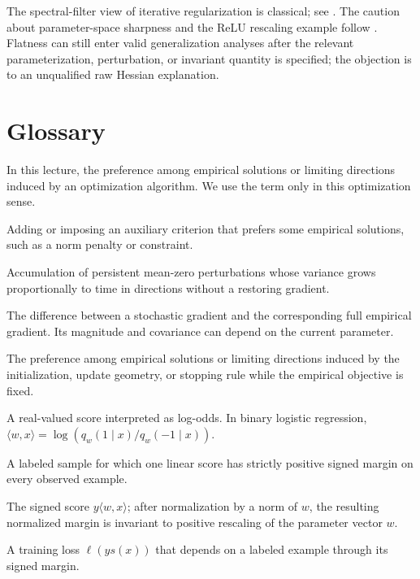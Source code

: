 \documentclass[11pt,twoside]{article}
\theoremstyle{definition}
\theoremstyle{remark}
\begin{document}
The spectral-filter view of iterative regularization is classical; see
\citet{yao2007}. The caution about parameter-space sharpness and the ReLU
rescaling example follow \citet{dinh2017}. Flatness can still enter valid
generalization analyses after the relevant parameterization, perturbation,
or invariant quantity is specified; the objection is to an unqualified raw
Hessian explanation.

\section*{Glossary}

\begin{description}[style=nextline,leftmargin=1.5em,labelindent=0pt]
\item[Algorithmic bias]
In this lecture, the preference among empirical solutions or limiting
directions induced by an optimization algorithm. We use the term only in
this optimization sense.
\item[Explicit regularization]
Adding or imposing an auxiliary criterion that prefers some empirical
solutions, such as a norm penalty or constraint.
\item[Diffusive behavior]
Accumulation of persistent mean-zero perturbations whose variance grows
proportionally to time in directions without a restoring gradient.
\item[Gradient noise]
The difference between a stochastic gradient and the corresponding full
empirical gradient. Its magnitude and covariance can depend on the current
parameter.
\item[Implicit bias]
The preference among empirical solutions or limiting directions induced by
the initialization, update geometry, or stopping rule while the empirical
objective is fixed.
\item[Logit]
A real-valued score interpreted as log-odds. In binary logistic regression,
$\langle w,x\rangle=\log(q_w(1\mid x)/q_w(-1\mid x))$.
\item[Linearly separable sample]
A labeled sample for which one linear score has strictly positive signed
margin on every observed example.
\item[Margin]
The signed score $y\langle w,x\rangle$; after normalization by a norm of $w$,
the resulting normalized margin is invariant to positive rescaling of the
parameter vector $w$.
\item[Margin loss]
A training loss $\ell(y s(x))$ that depends on a labeled example through its
signed margin.
\item[Model non-uniqueness]

\end{description}
\end{document}

